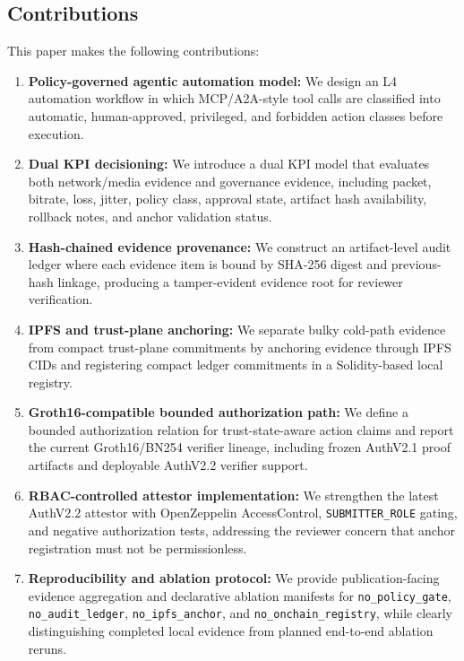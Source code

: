 \subsection{Contributions}

This paper makes the following contributions:

\begin{enumerate}
    \item \textbf{Policy-governed agentic automation model:} We design an L4 automation workflow in which MCP/A2A-style tool calls are classified into automatic, human-approved, privileged, and forbidden action classes before execution.

    \item \textbf{Dual KPI decisioning:} We introduce a dual KPI model that evaluates both network/media evidence and governance evidence, including packet, bitrate, loss, jitter, policy class, approval state, artifact hash availability, rollback notes, and anchor validation status.

    \item \textbf{Hash-chained evidence provenance:} We construct an artifact-level audit ledger where each evidence item is bound by SHA-256 digest and previous-hash linkage, producing a tamper-evident evidence root for reviewer verification.

    \item \textbf{IPFS and trust-plane anchoring:} We separate bulky cold-path evidence from compact trust-plane commitments by anchoring evidence through IPFS CIDs and registering compact ledger commitments in a Solidity-based local registry.

    \item \textbf{Groth16-compatible bounded authorization path:} We define a bounded authorization relation for trust-state-aware action claims and report the current Groth16/BN254 verifier lineage, including frozen AuthV2.1 proof artifacts and deployable AuthV2.2 verifier support.

    \item \textbf{RBAC-controlled attestor implementation:} We strengthen the latest AuthV2.2 attestor with OpenZeppelin AccessControl, \texttt{SUBMITTER\_ROLE} gating, and negative authorization tests, addressing the reviewer concern that anchor registration must not be permissionless.

    \item \textbf{Reproducibility and ablation protocol:} We provide publication-facing evidence aggregation and declarative ablation manifests for \texttt{no\_policy\_gate}, \texttt{no\_audit\_ledger}, \texttt{no\_ipfs\_anchor}, and \texttt{no\_onchain\_registry}, while clearly distinguishing completed local evidence from planned end-to-end ablation reruns.
\end{enumerate}
